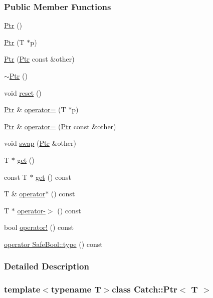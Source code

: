 \subsubsection*{Public Member Functions}
\begin{DoxyCompactItemize}
\item 
\hyperlink{a00065_a6108f0195595ee9d7a411daea810beaf}{Ptr} ()
\item 
\hyperlink{a00065_aacec063a79cd142e39040a31c6b3c40b}{Ptr} (T $\ast$p)
\item 
\hyperlink{a00065_ac629dd8ebe5763a37bb89e6c1d6a1771}{Ptr} (\hyperlink{a00065}{Ptr} const \&other)
\item 
\hyperlink{a00065_ac96d3bb33adcfb983207385cfba5fe8a}{$\sim$\+Ptr} ()
\item 
void \hyperlink{a00065_af8d0fa7a2cd20842830b354ac31dfe5c}{reset} ()
\item 
\hyperlink{a00065}{Ptr} \& \hyperlink{a00065_a9b08c868b447d679ed201921f5c94683}{operator=} (T $\ast$p)
\item 
\hyperlink{a00065}{Ptr} \& \hyperlink{a00065_af42074444c1bc6a70ebdc406a8617708}{operator=} (\hyperlink{a00065}{Ptr} const \&other)
\item 
void \hyperlink{a00065_a172bf8b4e71e26a5a4d92f5b02158b50}{swap} (\hyperlink{a00065}{Ptr} \&other)
\item 
T $\ast$ \hyperlink{a00065_a0123036c2fca74afceea9c0e3e5cc01b}{get} ()
\item 
const T $\ast$ \hyperlink{a00065_abf6f4d2d554086d9a2606add07716a16}{get} () const 
\item 
T \& \hyperlink{a00065_a3a4c139032a8bd1bffa553103d5dbfd3}{operator$\ast$} () const 
\item 
T $\ast$ \hyperlink{a00065_afaa13250d5e0ae5a440726d5e5aa7295}{operator-\/$>$} () const 
\item 
bool \hyperlink{a00065_aea1a99ded6d62423ccb9173fab91b56e}{operator!} () const 
\item 
\hyperlink{a00065_a27234c04feec43ffe0fd08e045557448}{operator Safe\+Bool\+::type} () const 
\end{DoxyCompactItemize}


\subsubsection{Detailed Description}
\subsubsection*{template$<$typename T$>$class Catch\+::\+Ptr$<$ T $>$}



